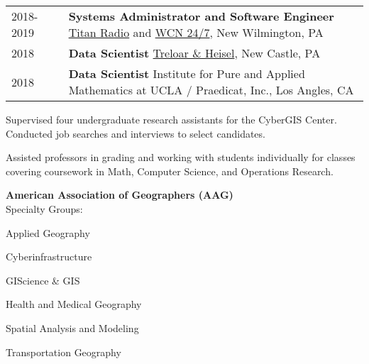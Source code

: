 \documentclass{acmcv}
\begin{document}

\begin{longtable}{p{0.16\linewidth} p{0.84\linewidth}}
    2018-2019 & \textbf{Systems Administrator and Software Engineer} \newline \href{http://titanradio.net/}{Titan Radio} and \href{https://www.wcn247.com/}{WCN 24/7}, New Wilmington, PA\\

    2018 & \textbf{Data Scientist} \newline \href{http://treloaronline.com/}{Treloar \& Heisel}, New Castle, PA\\

    2018 & \textbf{Data Scientist} \newline Institute for Pure and Applied Mathematics at UCLA / Praedicat, Inc., Los Angles, CA\\
\end{longtable}
    
\pagebreak
    
    \begin{titemize}
        \titem Supervised four undergraduate research assistants for the CyberGIS Center.
        \titem Conducted job searches and interviews to select candidates.
    \end{titemize}

    \begin{titemize}
    	\titem Assisted professors in grading and working with students individually for classes covering coursework in Math, Computer Science, and Operations Research.
    \end{titemize}


    \textbf{American Association of Geographers (AAG)} \\
    Specialty Groups: \\ \vspace{-.3cm}
    \begin{multicols}{2}
    \begin{titemize}
        \item Applied Geography
        \item Cyberinfrastructure
        \item GIScience \& GIS
        \item Health and Medical Geography
        \item Spatial Analysis and Modeling
        \item Transportation Geography
    \end{titemize}
    \end{multicols}
\end{document}
